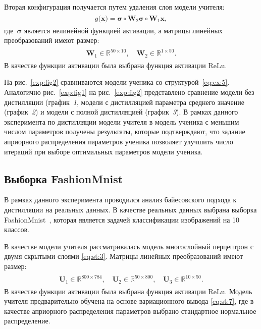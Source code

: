 \documentclass[12pt]{a&t}
\begin{document}
Вторая конфигурация получается путем удаления слоя модели учителя:
\begin{gather}
\label{eq:ex:5}
\begin{aligned}
g\bigr(\mathbf{x}\bigr) = \bm{\sigma} \circ \mathbf{W}_2\bm{\sigma} \circ \mathbf{W}_1\mathbf{x},
\end{aligned}
\end{gather}
где~$\bm{\sigma}$ является нелинейной функцией активации, а матрицы линейных преобразований имеют размер:
\begin{gather}
\label{eq:ex:6}
\begin{aligned}
\mathbf{W}_{1} \in \mathbb{R}^{50 \times 10}, \quad \mathbf{W}_{2} \in \mathbb{R}^{1 \times 50}.
\end{aligned}
\end{gather}
 В качестве функции активации была выбрана функция активации $\text{ReLu}$.



На рис.~\ref{exp:fig2} сравниваются модели ученика со структурой~\eqref{eq:ex:5}. Аналогично рис.~\ref{exp:fig1} на рис.~\ref{exp:fig2} представлено сравнение модели без дистилляции (график~\textit{1}, модели с дистилляцией параметра среднего значение (график~\textit{2}) и модели с полной дистилляцией (график~\textit{3}). В рамках данного эксперимента по дистилляции модели учителя в модель ученика с меньшим числом параметров получены результаты, которые подтверждают, что задание априорного распределения параметров ученика позволяет улучшить число итераций при выборе оптимальных параметров модели ученика.

\subsection{Выборка FashionMnist}

В рамках данного эксперимента проводился анализ байесовского подхода к дистилляции на реальных данных.  В качестве реальных данных выбрана выборка FashionMnist~\cite{fashionmnist}, которая является задачей классификации изображений на 10 классов.

В качестве модели учителя рассматривалась модель многослойный перцептрон с двумя скрытыми слоями \eqref{eq:st:3}. Матрицы линейных преобразований имеют размер:
\begin{gather}
\label{eq:ex:7}
\begin{aligned}
\mathbf{U}_{1} \in \mathbb{R}^{800 \times 784}, \quad \mathbf{U}_{2} \in \mathbb{R}^{50 \times 800}, \quad \mathbf{U}_{3} \in \mathbb{R}^{10 \times 50}.
\end{aligned}
\end{gather}
В качестве функции активации была выбрана функция активации $\text{ReLu}$.
Модель учителя предварительно обучена на основе вариационного вывода \eqref{eq:st:7}, где в качестве априорного распределения параметров выбрано стандартное нормальное распределение.
\end{document}
